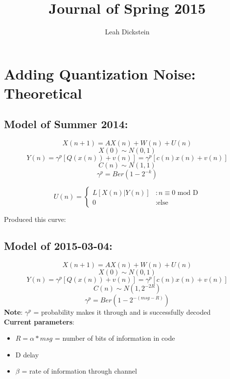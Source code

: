 \documentclass[leqno,twocolumn]{article}
\begin{document}
\onecolumn
\title{Journal of Spring 2015}
\author{Leah Dickstein}

\maketitle

\tableofcontents

\section{Adding Quantization Noise: Theoretical}
\subsection{Model of Summer 2014:}
\[ X(n+1) = AX(n) + W(n) + U(n) \]
\[ X(0) \sim N(0, 1) \]
\[ Y(n) = \gamma^p [ Q(x(n)) + v(n)] = \gamma^p [ c(n)x(n) + v(n) ] \]
\[ C(n) \sim N(1, 1) \]
\[ \gamma^p = Ber(1 - 2^{-k}) \]

 \begin{displaymath}
   U(n) = \left\{
     \begin{array}{lr}
       L[X(n) | Y(n) ] & : n \equiv 0 \text{ mod D}\\
       0 & : \text{else}
     \end{array}
   \right.
\end{displaymath} 

Produced this curve:
\begin{center}
\end{center}

\subsection{Model of 2015-03-04:}
\[ X(n+1) = AX(n) + W(n) + U(n) \]
\[ X(0) \sim N(0, 1) \]
\[ Y(n) = \gamma^p [ Q(x(n)) + v(n)] = \gamma^p [ c(n)x(n) + v(n) ] \]
\[ C(n) \sim N(1, 2^{-2R}) \]
\[ \gamma^p = Ber(1 - 2^{-(msg-R)}) \]
\textbf{Note}: $\gamma^p$ = probability makes it through and is successfully decoded\\

\textbf{Current parameters}:
\begin{itemize}
\item $R = \alpha * msg$ = number of bits of information in code
\item D delay
\item $\beta$ = rate of information through channel
\end{itemize}
\end{document}
